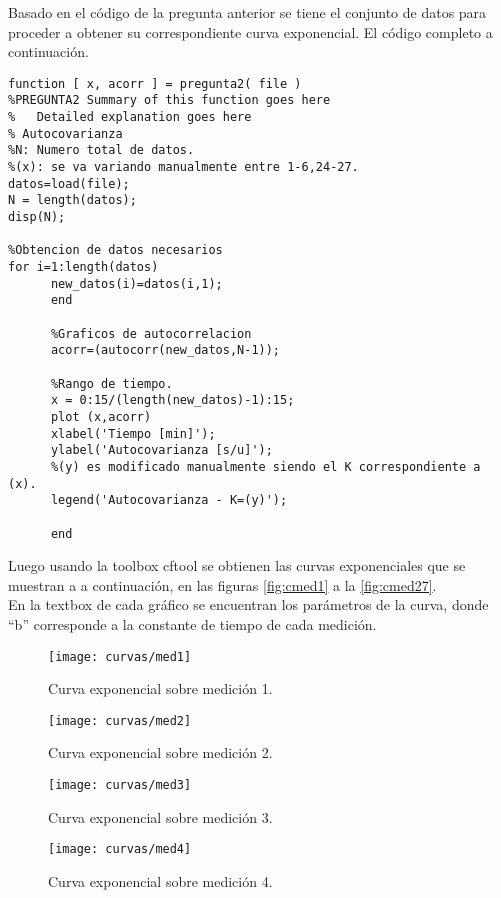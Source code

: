 \documentclass[12pt]{article}
\begin{document}
Basado en el código de la pregunta anterior se tiene el conjunto de datos para proceder 
a obtener su correspondiente curva exponencial. El código completo a continuación.

\begin{verbatim}
function [ x, acorr ] = pregunta2( file )
%PREGUNTA2 Summary of this function goes here
%   Detailed explanation goes here
% Autocovarianza
%N: Numero total de datos.
%(x): se va variando manualmente entre 1-6,24-27.
datos=load(file); 
N = length(datos);
disp(N);

%Obtencion de datos necesarios
for i=1:length(datos)
	  new_datos(i)=datos(i,1);
	  end

	  %Graficos de autocorrelacion
	  acorr=(autocorr(new_datos,N-1));

	  %Rango de tiempo.
	  x = 0:15/(length(new_datos)-1):15;
	  plot (x,acorr)
	  xlabel('Tiempo [min]');
	  ylabel('Autocovarianza [s/u]');
	  %(y) es modificado manualmente siendo el K correspondiente a (x).  
	  legend('Autocovarianza - K=(y)'); 

	  end
\end{verbatim}

Luego usando la toolbox cftool se obtienen las curvas exponenciales que se muestran a 
a continuación, en las figuras \ref{fig:cmed1} a la \ref{fig:cmed27}.\\

En la textbox de cada gráfico se encuentran los parámetros de la curva, donde ``b'' 
corresponde a la constante de tiempo de cada medición.\\

\begin{figure}[H]
\hfill
\begin{minipage}[t]{.45\textwidth}
  \centering
        \texttt{[image: curvas/med1]}
		\caption{\footnotesize Curva exponencial sobre medición 1.}
\label{fig:cmed1}
\end{minipage}
\hfill
\begin{minipage}[t]{.45\textwidth}
  \centering
        \texttt{[image: curvas/med2]}
		\caption{\footnotesize Curva exponencial sobre medición 2.}
\label{fig:cmed2}
\end{minipage}
\end{figure}

\begin{figure}[H]
\hfill
\begin{minipage}[t]{.45\textwidth}
  \centering
        \texttt{[image: curvas/med3]}
		\caption{\footnotesize Curva exponencial sobre medición 3.}
\label{fig:cmed3}
\end{minipage}
\hfill
\begin{minipage}[t]{.45\textwidth}
  \centering
        \texttt{[image: curvas/med4]}
		\caption{\footnotesize Curva exponencial sobre medición 4.}
\label{fig:cmed4}
\end{minipage}
\end{figure}
\end{document}
